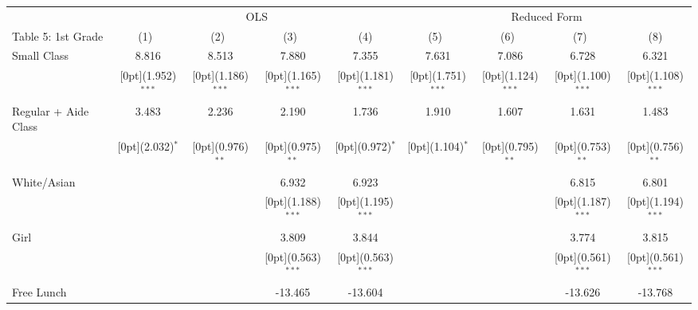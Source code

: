 \documentclass[a4paper,11pt]{article}
\begin{document}
\begin{table}[H]
	\setlength\tabcolsep{1.75pt} 
\begin{tabular*}{\textwidth}{@{\extracolsep{\fill}}lcccccccc}			& \multicolumn{4}{c}{OLS}  & \multicolumn{4}{c}{Reduced Form}\\
	\cline{2-5}	\cline{6-9}			
	Table 5: 1st Grade & \multicolumn{1}{c}{(1)\mbox{\ }} &	\multicolumn{1}{c}{(2)\mbox{\ }} &	\multicolumn{1}{c}{(3)\mbox{\ }} &	\multicolumn{1}{c}{(4)} & \multicolumn{1}{c}{(5)\mbox{\ }} &	\multicolumn{1}{c}{(6)\mbox{\ }} &	\multicolumn{1}{c}{(7)\mbox{\ }} &	\multicolumn{1}{c}{(8)} \\
	\hline								
	Small Class &	8.816 &	8.513 &	7.880 &	7.355 &	7.631 &	7.086 &	6.728 &	6.321  \\
	&	\raisebox{.7ex}[0pt]{\scriptsize (1.952)$^{***}$} &	\raisebox{.7ex}[0pt]{\scriptsize (1.186)$^{***}$} &	\raisebox{.7ex}[0pt]{\scriptsize (1.165)$^{***}$} &	\raisebox{.7ex}[0pt]{\scriptsize (1.181)$^{***}$}	&	\raisebox{.7ex}[0pt]{\scriptsize (1.751)$^{***}$} &	\raisebox{.7ex}[0pt]{\scriptsize (1.124)$^{***}$} &	\raisebox{.7ex}[0pt]{\scriptsize (1.100)$^{***}$} &	\raisebox{.7ex}[0pt]{\scriptsize (1.108)$^{***}$} \\
	Regular + Aide Class &	3.483 &	2.236 &	2.190 &	1.736 &	1.910 &	1.607 &	1.631 &	1.483\\
	&	\raisebox{.7ex}[0pt]{\scriptsize (2.032)$^{*}$} &	\raisebox{.7ex}[0pt]{\scriptsize (0.976)$^{**}$} &	\raisebox{.7ex}[0pt]{\scriptsize (0.975)$^{**}$} &	\raisebox{.7ex}[0pt]{\scriptsize (0.972)$^{*}$} &	\raisebox{.7ex}[0pt]{\scriptsize (1.104)$^{*}$} &	\raisebox{.7ex}[0pt]{\scriptsize (0.795)$^{**}$} &	\raisebox{.7ex}[0pt]{\scriptsize (0.753)$^{**}$} &	\raisebox{.7ex}[0pt]{\scriptsize (0.756)$^{**}$}  \\
	White/Asian &	&	&	6.932 &	6.923&	&	&	6.815 &	6.801 \\
	&	&	&	\raisebox{.7ex}[0pt]{\scriptsize (1.188)$^{***}$} &	\raisebox{.7ex}[0pt]{\scriptsize (1.195)$^{***}$} 	&	&	&	\raisebox{.7ex}[0pt]{\scriptsize (1.187)$^{***}$} &	\raisebox{.7ex}[0pt]{\scriptsize (1.194)$^{***}$} \\
	Girl &	&	&	3.809 &	3.844  &	&	&	3.774 &	3.815\\
	&	&	&	\raisebox{.7ex}[0pt]{\scriptsize (0.563)$^{***}$} &	\raisebox{.7ex}[0pt]{\scriptsize (0.563)$^{***}$} &	&	&	\raisebox{.7ex}[0pt]{\scriptsize (0.561)$^{***}$} &	\raisebox{.7ex}[0pt]{\scriptsize (0.561)$^{***}$} \\
	Free Lunch &	&	&	-13.465 &	-13.604  &	&	&	-13.626 &	-13.768  \\

\end{tabular*}
\end{table}
\end{document}
